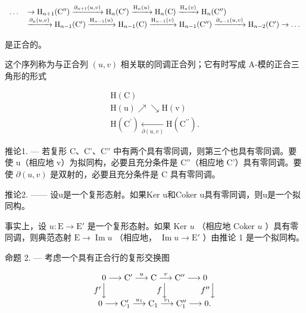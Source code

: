 \[
\begin{array}{r l} \dots & \to \mathrm{H} _ {n + 1} (\mathrm{C} ^ {\prime \prime}) \xrightarrow {\partial_ {n + 1} (u , v)} \mathrm{H} _ {n} (\mathrm{C} ^ {\prime}) \xrightarrow {\mathrm{H} _ {n} (u)} \mathrm{H} _ {n} (\mathrm{C}) \xrightarrow {\mathrm{H} _ {n} (v)} \mathrm{H} _ {n} (\mathrm{C} ^ {\prime \prime}) \\ & \xrightarrow {\partial_ {n} (u , v)} \mathrm{H} _ {n - 1} (\mathrm{C} ^ {\prime}) \xrightarrow {\mathrm{H} _ {n - 1} (u)} \mathrm{H} _ {n - 1} (\mathrm{C}) \xrightarrow {\mathrm{H} _ {n - 1} (v)} \mathrm{H} _ {n - 1} (\mathrm{C} ^ {\prime \prime}) \xrightarrow {\partial_ {n - 1} (u , v)} \mathrm{H} _ {n - 2} (\mathrm{C} ^ {\prime}) \to \dots \end{array}
\]

是正合的。

这个序列称为与正合列 \((u, v)\) 相关联的同调正合列；它有时写成 A-模的正合三角形的形式

\[
\begin{array}{c} \mathrm{H(C)} \\ \mathrm{H(u)} \nearrow \searrow \mathrm{H(v)} \\ \mathrm {H(C^ {\prime})} \xleftarrow [ \partial (u , v) ]{} \mathrm {H(C^{\prime\prime})}. \end{array}
\]

推论1. --- 若复形 C、C'、C'' 中有两个具有零同调，则第三个也具有零同调。要使 u（相应地 v）为拟同构，必要且充分条件是 C''（相应地 C'）具有零同调。要使 \(\partial(u, v)\) 是双射的，必要且充分条件是 C 具有零同调。

推论2. —— 设u是一个复形态射。如果Ker u和Coker u具有零同调，则u是一个拟同构。

事实上，设 \(u: \mathrm{E} \to \mathrm{E}'\) 是一个复形态射。如果 Ker \(u\) （相应地 Coker \(u\) ）具有零同调，则典范态射 \(\mathrm{E} \to \operatorname{Im} u\) （相应地， \(\operatorname{Im} u \to \mathrm{E}'\) ）由推论 1 是一个拟同构。

命题 2. — 考虑一个具有正合行的复形交换图

\[
\begin{array}{c} 0 \longrightarrow \mathrm{C} ^ {\prime} \stackrel {{u}} {{\longrightarrow}} \mathrm{C} \stackrel {{v}} {{\longrightarrow}} \mathrm{C} ^ {\prime \prime} \longrightarrow 0 \\ f ^ {\prime} \Big \downarrow \qquad \qquad \qquad f \Big \downarrow \qquad \qquad f ^ {\prime \prime} \Big \downarrow \\ 0 \longrightarrow \mathrm{C} _ {1} ^ {\prime} \stackrel {{u _ {1}}} {{\longrightarrow}} \mathrm{C} _ {1} \stackrel {{v _ {1}}} {{\longrightarrow}} \mathrm{C} _ {1} ^ {\prime \prime} \longrightarrow 0. \end{array}
\]

